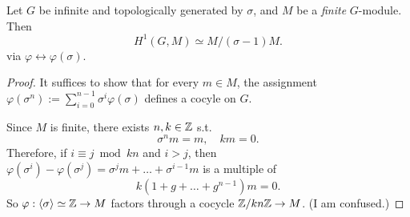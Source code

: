\begin{example}
    Let $G$ be infinite and topologically generated by $\sigma$,
    and $M$ be a \textit{finite} $G$-module.
    Then \[H^1(G, M)\simeq M/(\sigma - 1)M.\]
    via $\varphi \leftrightarrow \varphi(\sigma)$.
\begin{proof}
It suffices to show that for every $m\in M$,
the assignment $\varphi(\sigma^n) := \sum_{i=0}^{n-1}\sigma^i\varphi(\sigma)$ defines a cocyle on $G$.

Since $M$ is finite, there exists $n,k\in\mathbb{Z}$ s.t.
\[\sigma^n m = m,\quad km = 0.\]
Therefore, if $i\equiv j\bmod kn$ and $i > j$,
then $
    \varphi(\sigma^i) - \varphi(\sigma^j)
    = \sigma^jm + \dots + \sigma^{i-1}m
$ is a multiple of \[k(1 + g + \dots + g^{n-1})m = 0.\]
So $\varphi : \left\langle \sigma \right\rangle\simeq \mathbb{Z}\to M$ factors through a cocycle $\mathbb{Z}/kn\mathbb{Z}\to M$.
{\color{blue}(I am confused.)}
\end{proof}
\end{example}





